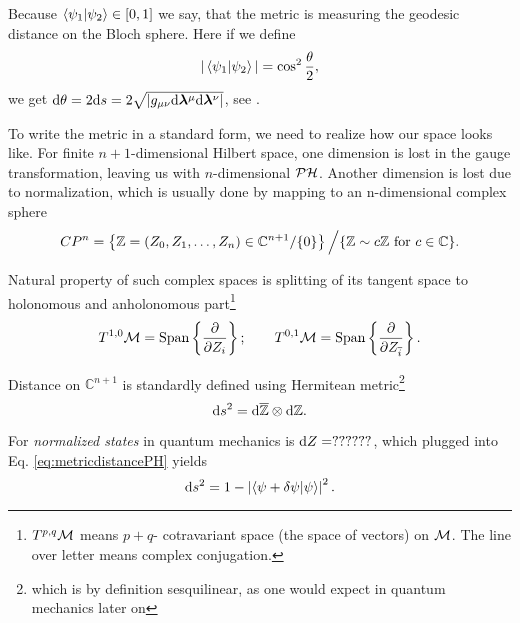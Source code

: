 Because $\braket{\psi_1|\psi_2}\in[0,1]$ we say, that the metric is measuring the geodesic distance on the Bloch sphere. Here if we define
\begin{equation}
    |\braket{\psi_1|\psi_2}|=\cos^2 \frac{\theta}{2},
\end{equation}
we get $\mathrm{d} \theta= 2\mathrm{d} s=2\sqrt{|g_{\mu\nu}\mathrm{d} {\bm\lambda}^\mu\mathrm{d} {\bm\lambda}^\nu|}$, see \citet{cheng_quantum_2013}.

To write the metric in a standard form, we need to realize how our space looks like. For finite $n+1$-dimensional Hilbert space, one dimension is lost in the gauge transformation, leaving us with $n$-dimensional $\mathcal{PH}$. Another dimension is lost due to normalization, which is usually done by mapping to an n-dimensional complex sphere
$$CP^n= \left\{ \mathbb{Z}=(Z_0,Z_1,\dots,Z_n)\in \mathbb{C}^{n+1}/\{0\} \right\}\Big/ \{\mathbb{Z}\sim c\mathbb{Z} \text{ for } c\in \mathbb{C}\}.$$

Natural property of such complex spaces is splitting of its tangent space to holonomous and anholonomous part\footnote{$T^{p,q}\mathcal{M}$ means $p+q$- cotravariant space (the space of vectors) on $\mathcal{M}$. The line over letter means complex conjugation.}
$$T^{1,0}\mathcal{M}=\text{Span}\left\{\frac{\partial}{\partial Z_i}\right\}; \qquad T^{0,1}\mathcal{M}=\text{Span}\left\{\frac{\partial}{\partial Z_{\overline{i}}}\right\}.$$


Distance on $\mathbb{C}^{n+1}$ is standardly defined using Hermitean metric\footnote{which is by definition sesquilinear, as one would expect in quantum mechanics later on} 
\begin{equation}
    \mathrm{d} s^2 = \mathrm{d} \overline{\mathbb{Z}} \otimes \mathrm{d} \mathbb{Z}.
\label{eq:metricdistancePH}
\end{equation}


For \emph{normalized states} in quantum mechanics is $\mathrm{d} Z=??????$, which plugged into Eq. \ref{eq:metricdistancePH} yields
\begin{equation}
    \mathrm{d} s^2 = 1-\left|\braket{\psi+\delta \psi|\psi}\right|^2.
    \label{eq:distanceInPH}
\end{equation}


